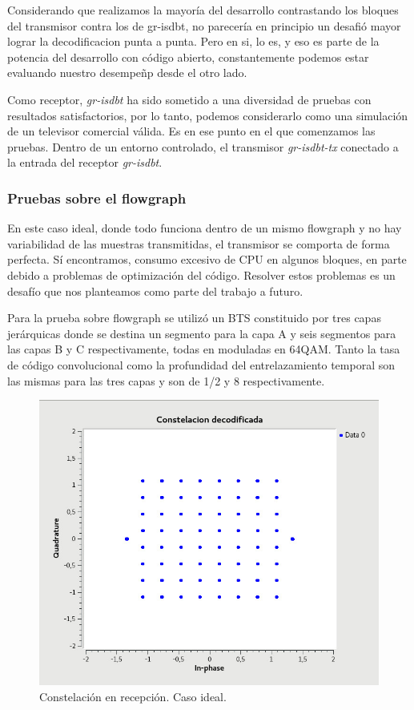Considerando que realizamos la mayoría del desarrollo contrastando los bloques del transmisor contra los de gr-isdbt, no parecería en principio un desafió mayor lograr la decodificacion punta a punta. Pero en si, lo es, y eso es parte de la potencia del desarrollo con código abierto, constantemente podemos estar evaluando nuestro desempeñp desde el otro lado. 

Como receptor, \textit{gr-isdbt} ha sido sometido a una diversidad de pruebas con resultados satisfactorios, por lo tanto, podemos considerarlo como una simulación de un televisor comercial válida. Es en ese punto en el que comenzamos las pruebas. Dentro de un entorno controlado, el transmisor \textit{gr-isdbt-tx} conectado a la entrada del receptor \textit{gr-isdbt}.

\subsubsection{Pruebas sobre el flowgraph}

En este caso ideal, donde todo funciona dentro de un mismo flowgraph y no hay variabilidad de las muestras transmitidas, el transmisor se comporta de forma perfecta. Sí encontramos, consumo excesivo de CPU en algunos bloques, en parte debido a problemas de optimización del código. Resolver estos problemas es un desafío que nos planteamos como parte del trabajo a futuro.

Para la prueba sobre flowgraph se utilizó un BTS constituido por tres capas jerárquicas donde se destina un segmento para la capa A y seis segmentos para las capas B y C respectivamente, todas en moduladas en 64QAM. Tanto la tasa de código convolucional como la profundidad del entrelazamiento temporal son las mismas para las tres capas y son de 1/2 y 8 respectivamente. 

\begin{figure}[!h]
	\centering
	\includegraphics[scale=0.5]{figuras/cap06/const_rec}
	\caption{\label{f:const_rec} Constelación en recepción. Caso ideal.}
\end{figure}

